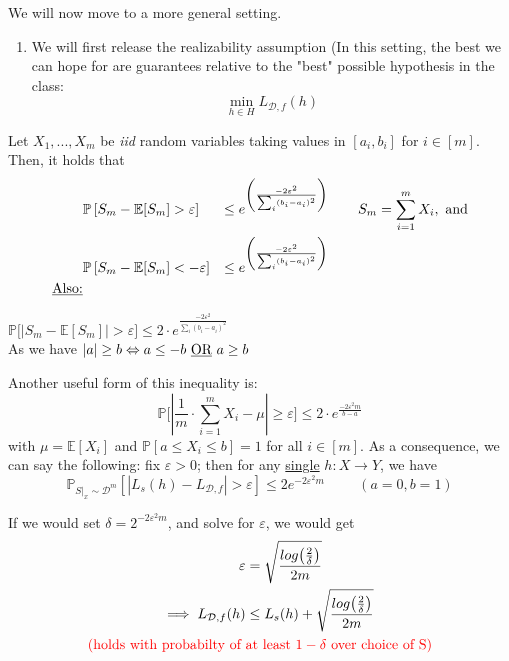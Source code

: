 \documentclass[10pt,a4paper]{article}
\theoremstyle{definition}
\theoremstyle{plain}
\begin{document}
We will now move to a more general setting.
\begin{enumerate}[label*=\protect\fbox{\arabic{enumi}}]
	\item We will first release the realizability assumption (In this setting, the best we can hope for are guarantees relative to the "best" possible hypothesis in the class: $$\min_{h \in H}{L_{\mathcal{D}, f}(h)}$$
\end{enumerate}
	\begin{boxeddef}
	Let $X_1, ..., X_m$ be \textit{iid} random variables taking values in $[a_i, b_i]$ for $i \in [m]$. Then, it holds that
	 \begin{align*}
	 	&\mathbb{P}\left[S_m - \mathbb{E}[S_m] > \varepsilon\right] &\leq e^{\left(\frac{-2 \varepsilon^2}{\sum_{i} (b_i - a_i)^2}\right)} && \hspace{0.4cm} S_m = \sum_{i = 1}^{m} X_i, \text{ and}\\
	 	&\mathbb{P}\left[S_m - \mathbb{E}[S_m] < -\varepsilon\right] &\leq e^{\left(\frac{-2 \varepsilon^2}{\sum_{i} (b_i - a_i)^2}\right)}\\
	 	\text{\underline{Also:}}
	 \end{align*}
	 \begin{center}
	 	\colorbox{Apricot}{$\mathbb{P}\bigg[\big|S_m - \mathbb{E}[S_m]\big| > \varepsilon\bigg] \leq 2 \cdot e^{\frac{-2 \varepsilon^2}{\sum_{i} (b_i - a_i)^2}}$}\\
 		 As we have $|a| \geq b \Leftrightarrow a \leq -b \text{ \underline{OR} } a \geq b$
	 \end{center}


\end{boxeddef}
Another useful form of this inequality is:
$$ \mathbb{P} \bigg[\left| \frac{1}{m} \cdot \sum_{i = 1}^{m} X_i - \mu \right| \geq \varepsilon\bigg] \leq 2 \cdot e^{\frac{-2 \varepsilon^2 m}{b-a}} $$
with $\mu = \mathbb{E}[X_i]$ and $\mathbb{P}[a \leq X_i \leq b] = 1$ for all $i \in [m]$. As a consequence, we can say the following: fix $\varepsilon>0$; then for any \colorbox{Apricot}{\underline{single} $h: X \to Y$}, we have 
$$ \mathbb{P}_{S|_x \sim \mathcal{D}^m}\left[\left|L_{s}(h) - L_{\mathcal{D}, f}\right| > \varepsilon\right] \leq 2 e^{-2\varepsilon^2 m} \hspace{1cm} (a = 0, b = 1)$$

If we would set $\delta = 2^{-2 \varepsilon^2 m}$, and solve for $\varepsilon$, we would get
\begin{align*}
\varepsilon &= \sqrt{\frac{log\big(\frac{2}{\delta}\big)}{2m}}\\
\implies L_{\mathcal{D},f}(h) &\leq L_{s}(h) + \sqrt{\frac{log\big(\frac{2}{\delta}\big)}{2m}}\\
\text{\textcolor{red}{(holds with probabilty of }} & \text{\textcolor{red}{at least $1-\delta$ over choice of S)}}
\end{align*}
\end{document}
